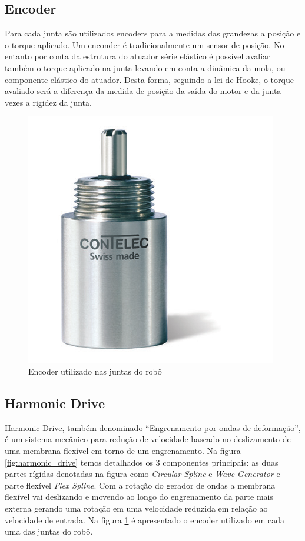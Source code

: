 

\subsection{Encoder}


Para cada junta são utilizados encoders para a medidas das grandezas a posição e o torque aplicado. Um enconder é tradicionalmente um sensor de posição. No entanto por conta da estrutura do atuador série elástico é possível avaliar também o torque aplicado na junta levando em conta a dinâmica da mola, ou componente elástico do atuador. Desta forma, seguindo a lei de Hooke, o torque avaliado será a diferença da medida de posição da saída do motor e da junta vezes a rigidez da junta. 

\begin{figure}[H]
    \centering
    \includegraphics[width = 0.4\linewidth]{figs/vertX-encoder}
        \caption{Encoder utilizado nas juntas do robô}
    \label{fig:encoder}
\end{figure}

\subsection{Harmonic Drive \label{subsec:harmonic-drive}}

Harmonic Drive, também denominado ``Engrenamento por ondas de deformação'', é um sistema mecânico para redução de velocidade baseado no deslizamento de uma membrana flexível em torno de um engrenamento. Na figura \ref{fig:harmonic_drive} temos detalhados os 3 componentes principais: as duas partes rígidas denotadas na figura como \textit{Circular Spline} e \textit{Wave Generator} e parte flexível \textit{Flex Spline}. Com a rotação do gerador de ondas a membrana flexível vai deslizando e movendo ao longo do engrenamento da parte mais externa gerando uma rotação em uma velocidade reduzida em relação ao velocidade de entrada. Na figura \ref{fig:encoder} é apresentado o encoder utilizado em cada uma das juntas do robô.

